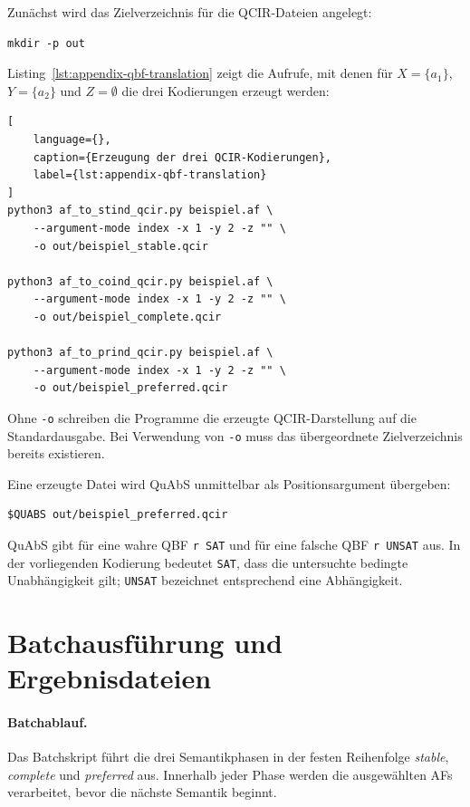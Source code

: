 Zunächst wird das Zielverzeichnis für die QCIR-Dateien
angelegt:
\begin{lstlisting}[language={}]
mkdir -p out
\end{lstlisting}
Listing~\ref{lst:appendix-qbf-translation} zeigt die Aufrufe, mit denen für
\(X=\{a_1\}\), \(Y=\{a_2\}\) und \(Z=\emptyset\) die drei Kodierungen
erzeugt werden:
\begin{lstlisting}[
    language={},
    caption={Erzeugung der drei QCIR-Kodierungen},
    label={lst:appendix-qbf-translation}
]
python3 af_to_stind_qcir.py beispiel.af \
    --argument-mode index -x 1 -y 2 -z "" \
    -o out/beispiel_stable.qcir

python3 af_to_coind_qcir.py beispiel.af \
    --argument-mode index -x 1 -y 2 -z "" \
    -o out/beispiel_complete.qcir

python3 af_to_prind_qcir.py beispiel.af \
    --argument-mode index -x 1 -y 2 -z "" \
    -o out/beispiel_preferred.qcir
\end{lstlisting}
Ohne \texttt{-o} schreiben die Programme die erzeugte QCIR-Darstellung
auf die Standardausgabe. Bei Verwendung von \texttt{-o} muss das
übergeordnete Zielverzeichnis bereits existieren.

Eine erzeugte Datei wird QuAbS unmittelbar als Positionsargument
übergeben:
\begin{lstlisting}[language={}]
$QUABS out/beispiel_preferred.qcir
\end{lstlisting}
QuAbS gibt für eine wahre QBF \texttt{r SAT} und für eine falsche QBF
\texttt{r UNSAT} aus. In der vorliegenden Kodierung bedeutet
\texttt{SAT}, dass die untersuchte bedingte Unabhängigkeit gilt;
\texttt{UNSAT} bezeichnet entsprechend eine Abhängigkeit.

\section{Batchausführung und Ergebnisdateien}
\label{sec:appendix-qbf-batch-execution}

\paragraph{Batchablauf.}

Das Batchskript führt die drei Semantikphasen in der festen Reihenfolge
\emph{stable}, \emph{complete} und \emph{preferred} aus. Innerhalb
jeder Phase werden die ausgewählten AFs verarbeitet, bevor die nächste
Semantik beginnt.

